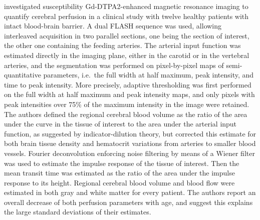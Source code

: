 \citet{Rempp:1994kk} investigated susceptibility Gd-DTPA2-enhanced magnetic resonance imaging to quantify cerebral perfusion in a clinical study with twelve healthy patients with intact blood-brain barrier.
A dual FLASH sequence was used, allowing interleaved acquisition in two parallel sections, one being the section of interest, the other one containing the feeding arteries.
The arterial input function was estimated directly in the imaging plane, either in the carotid or in the vertebral arteries, and the segmentation was performed on pixel-by-pixel maps of semi-quantitative parameters, i.e.~the full width at half maximum, peak intensity, and time to peak intensity.
More precisely, adaptive thresholding was first performed on the full width at half maximum and peak intensity maps, and only pixels with peak intensities over 75\% of the maximum intensity in the image were retained.
The authors defined the regional cerebral blood volume as the ratio of the area under the curve in the tissue of interest to the area under the arterial input function, as suggested by indicator-dilution theory, but corrected this estimate for both brain tissue density and hematocrit variations from arteries to smaller blood vessels.
Fourier deconvolution enforcing noise filtering by means of a Wiener filter was used to estimate the impulse response of the tissue of interest.
Then the mean transit time was estimated as the ratio of the area under the impulse response to its height.
Regional cerebral blood volume and blood flow were estimated in both gray and white matter for every patient.
The authors report an overall decrease of both perfusion parameters with age, and suggest this explains the large standard deviations of their estimates.

